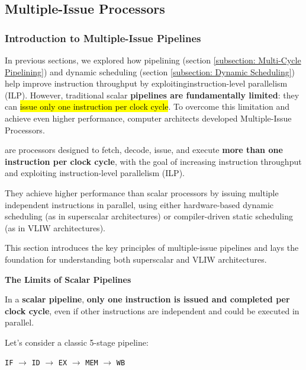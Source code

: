 \subsection{Multiple-Issue Processors}

\subsubsection{Introduction to Multiple-Issue Pipelines}\label{subsubsection: Introduction to Multiple-Issue Pipelines}

In previous sections, we explored how pipelining (section \ref{subsection: Multi-Cycle Pipelining}) and dynamic scheduling (section \ref{subsection: Dynamic Scheduling}) help improve instruction throughput by exploiting\break instruction-level parallelism (ILP). However, traditional scalar \textbf{pipelines are fundamentally limited}: they can \hl{issue only one instruction per clock cycle}. To overcome this limitation and achieve even higher performance, computer architects developed Multiple-Issue Processors.

\highspace
\begin{definitionbox}
     are processors designed to fetch, decode, issue, and execute \textbf{more than one instruction per clock cycle}, with the goal of increasing instruction throughput and exploiting instruction-level parallelism (ILP).
\end{definitionbox}

\noindent
They achieve higher performance than scalar processors by issuing multiple independent instructions in parallel, using either hardware-based dynamic scheduling (as in superscalar architectures) or compiler-driven static scheduling (as in VLIW architectures).

\highspace
This section introduces the key principles of multiple-issue pipelines and lays the foundation for understanding both superscalar and VLIW architectures.

\highspace
\begin{flushleft}
    \textcolor{Red2}{ \textbf{The Limits of Scalar Pipelines}}
\end{flushleft}
In a \textbf{scalar pipeline}, \textbf{only one instruction is issued and completed per clock cycle}, even if other instructions are independent and could be executed in parallel.

\highspace
Let's consider a classic 5-stage pipeline:
\begin{center}
    \texttt{IF} $\rightarrow$ \texttt{ID} $\rightarrow$ \texttt{EX} $\rightarrow$ \texttt{MEM} $\rightarrow$ \texttt{WB}
\end{center}

